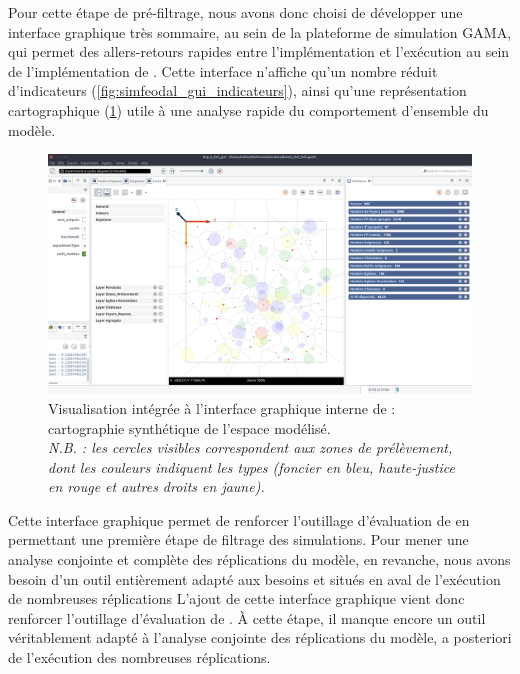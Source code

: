Pour cette étape de pré-filtrage, nous avons donc choisi de développer une interface graphique très sommaire, au sein de la plateforme de simulation GAMA, qui permet des allers-retours rapides entre l'implémentation et l'exécution au sein de l'implémentation de \simfeodal{}.
Cette interface n'affiche qu'un nombre réduit d'indicateurs (\cref{fig:simfeodal_gui_indicateurs}), ainsi qu'une représentation cartographique (\cref{fig:simfeodal_gui_carte}) utile à une analyse rapide du comportement d'ensemble du modèle.

\begin{figure}[H]
	\captionsetup{width=\linewidth}
	\includegraphics[width=\linewidth]{img/SimFeodal_GUI_carte.png}
	\caption[Visualisation intégrée à l'interface graphique interne de \simfeodal{}.]{Visualisation intégrée à l'interface graphique interne de \simfeodal{} : cartographie synthétique de l'espace modélisé.\\
	\textit{N.B. : les cercles visibles correspondent aux zones de prélèvement, dont les couleurs indiquent les types (foncier en bleu, haute-justice en rouge et autres droits en jaune).}}
	\label{fig:simfeodal_gui_carte}
\end{figure}


Cette interface graphique permet de renforcer l'outillage d'évaluation de \simfeodal{} en permettant une première étape de filtrage des simulations.
Pour mener une analyse conjointe et complète des réplications du modèle, en revanche, nous avons besoin d'un outil entièrement adapté aux besoins et situés en aval de l'exécution de nombreuses réplications
L'ajout de cette interface graphique vient donc renforcer l'outillage d'évaluation de \simfeodal{}.
À cette étape, il manque encore un outil véritablement adapté à l'analyse conjointe des réplications du modèle, a posteriori de l'exécution des nombreuses réplications.

